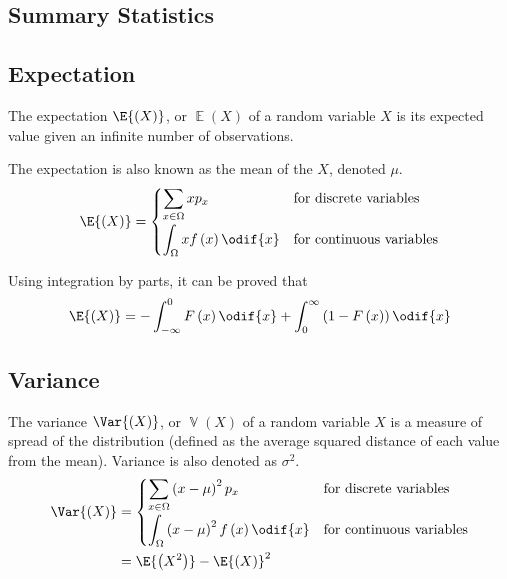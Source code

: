 \documentclass{article}
\begin{document}
\begin{multicols}{3}
    \subsection{Summary Statistics}
    \subsection{Expectation}
    The expectation \(\E{\left( X \right)}\), or \(\operatorname{\mathbb{E}}{\left( X \right)}\)
    of a random variable \(X\) is its expected value given an
    infinite number of observations.

    The expectation is also known as the mean of the \(X\), denoted \(\mu\).
    \begin{equation*}
        \E{\left( X \right)} =
        \begin{cases}
            \displaystyle \sum_{x \in \Omega} x p_x                & \text{for discrete variables}   \\[0.4cm]
            \displaystyle \int_\Omega x f\left( x \right) \odif{x} & \text{for continuous variables}
        \end{cases}
    \end{equation*}
    \begin{theorem}
        Using integration by parts, it can be proved that
        \begin{equation*}
            \E{\left(X\right)} = -\int_{-\infty}^0 F\left( x \right) \odif{x} + \int_0^\infty \left(1 - F\left( x \right)\right) \odif{x}
        \end{equation*}
    \end{theorem}
    \subsection{Variance}
    The variance \(\Var{\left( X \right)}\), or \(\operatorname{\mathbb{V}}{\left( X \right)}\) of a random variable \(X\) is a measure of spread
    of the distribution (defined as the average squared distance of each value from the mean).
    Variance is also denoted as \(\sigma^2\).
    \begin{align*}
        \Var{\left( X \right)} & =
        \begin{cases}
            \displaystyle \sum_{x \in \Omega} \left( x - \mu \right)^2 p_x                  & \text{for discrete variables}   \\[0.4cm]
            \displaystyle \int_{\Omega} \left( x - \mu \right)^2 f\left( x \right) \odif{x} & \text{for continuous variables}
        \end{cases} \\
                               & = \E{\left( X^2 \right)} - \E{\left( X \right)}^2
    \end{align*}

\end{multicols}
\end{document}
